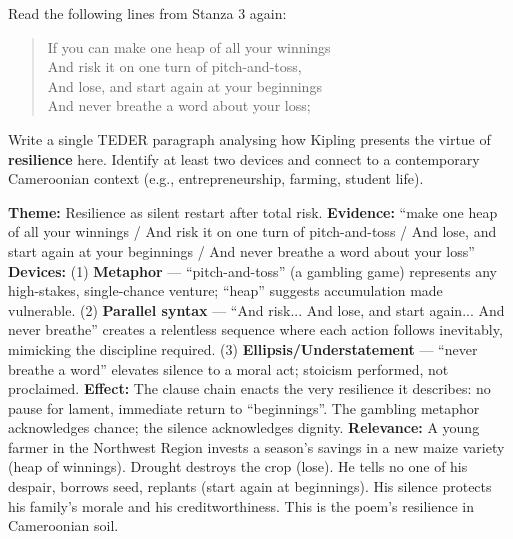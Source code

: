 \documentclass[11pt]{article}
\begin{document}
\begin{exercice}
Read the following lines from Stanza 3 again:
\begin{quote}
If you can make one heap of all your winnings \\
And risk it on one turn of pitch-and-toss, \\
And lose, and start again at your beginnings \\
And never breathe a word about your loss;
\end{quote}
Write a single TEDER paragraph analysing how Kipling presents the virtue of \textbf{resilience} here. Identify at least two devices and connect to a contemporary Cameroonian context (e.g., entrepreneurship, farming, student life).
\end{exercice}

\begin{corrige}
\textbf{Theme:} Resilience as silent restart after total risk.
\textbf{Evidence:} ``make one heap of all your winnings / And risk it on one turn of pitch-and-toss / And lose, and start again at your beginnings / And never breathe a word about your loss''
\textbf{Devices:} (1) \textbf{Metaphor} — ``pitch-and-toss'' (a gambling game) represents any high-stakes, single-chance venture; ``heap'' suggests accumulation made vulnerable. (2) \textbf{Parallel syntax} — ``And risk... And lose, and start again... And never breathe'' creates a relentless sequence where each action follows inevitably, mimicking the discipline required. (3) \textbf{Ellipsis/Understatement} — ``never breathe a word'' elevates silence to a moral act; stoicism performed, not proclaimed.
\textbf{Effect:} The clause chain enacts the very resilience it describes: no pause for lament, immediate return to ``beginnings''. The gambling metaphor acknowledges chance; the silence acknowledges dignity.
\textbf{Relevance:} A young farmer in the Northwest Region invests a season's savings in a new maize variety (heap of winnings). Drought destroys the crop (lose). He tells no one of his despair, borrows seed, replants (start again at beginnings). His silence protects his family's morale and his creditworthiness. This is the poem's resilience in Cameroonian soil.
\end{corrige}
\end{document}
